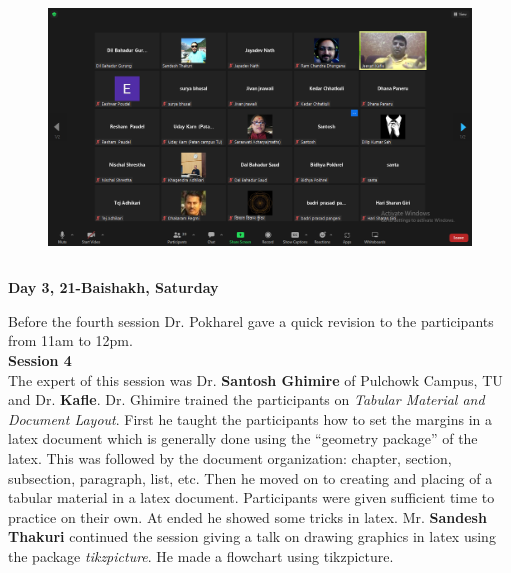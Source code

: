 \message{ !name(latexworkhop_report.tex)}\documentclass[a4paper,12pt]{report}
\begin{document}
\begin{figure}[h!]
  \centering
  \includegraphics[height=7cm, width=15cm]{online3.png}
\end{figure}
\clearpage


\begin{center}
  {\bfseries \Large Day 3, 21-Baishakh, Saturday}
\end{center}
\vspace{3mm}

Before the fourth session Dr. Pokharel gave a quick revision to the participants from 11am to 12pm.\\

{\bfseries \large Session 4}\\[3mm]
The expert of this session was Dr. \textbf{Santosh Ghimire} of Pulchowk Campus, TU and Dr. \textbf{Kafle}. Dr. Ghimire trained the participants on \textit{Tabular Material and Document Layout}. First he taught the participants how to set the margins in a latex document which is generally done using the ``geometry package'' of the latex. This was followed by the document organization: chapter, section, subsection, paragraph, list, etc. Then he moved on to creating and placing of a tabular material in a latex document. Participants were given sufficient time to practice on their own. At ended he showed some tricks in latex. Mr. \textbf{Sandesh Thakuri} continued the session giving a talk on drawing graphics in latex using the package \textit{tikzpicture}. He made a flowchart using tikzpicture.
\vspace{7mm}
\end{document}
